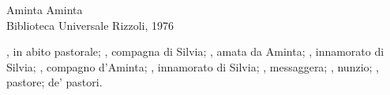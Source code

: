 \documentclass{book}
\begin{document}
                 {Aminta}
                 {Aminta\\[.5ex]Biblioteca Universale Rizzoli, 1976}

\Drama



\Versus

\cleardoublepage
{}
\cleardoublepage
{}

{\Facies* \textus {\itshape }
 \Locus           {\leftmargin + 1.25in}
 \Facies  {}
 \Locus             {}

\1, in abito pastorale; 
\2, compagna di Silvia; 
\3, amata da Aminta;  
\4, innamorato di Silvia; 
\5, compagno d'Aminta;  
\6, innamorato di Silvia; 
\7, messaggera;  
, nunzio; 
\8, pastore; 
\9 de' pastori. 

}

\Locus \textus   {+7em}

\cleardoublepage
{}
\pagestyle {maintext} 
\thispagestyle{empty}

\end{document}
